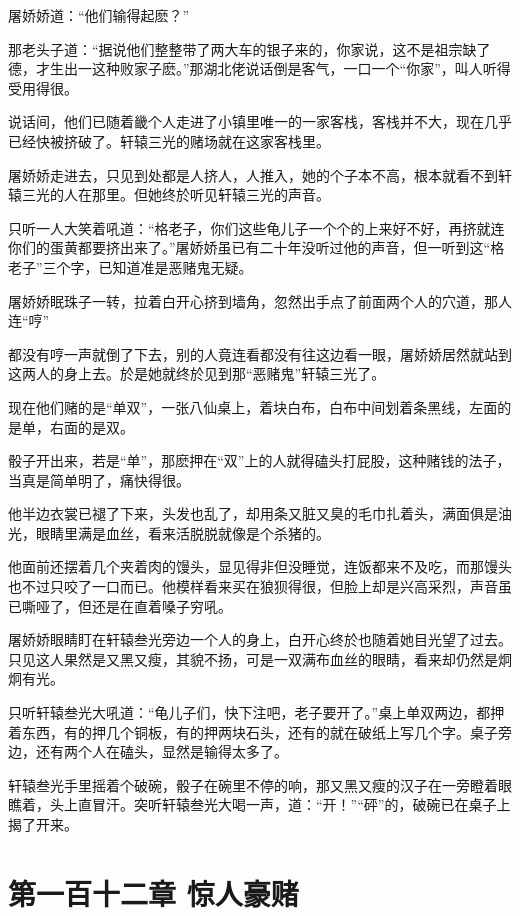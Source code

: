 \documentclass[12pt,oneside]{book}
\begin{document}
屠娇娇道：``他们输得起麽？''

那老头子道：``据说他们整整带了两大车的银子来的，你家说，这不是祖宗缺了德，才生出一这种败家子麽。''那湖北佬说话倒是客气，一口一个``你家''，叫人听得受用得很。

说话间，他们已随着畿个人走进了小镇里唯一的一家客栈，客栈并不大，现在几乎已经快被挤破了。轩辕三光的赌场就在这家客栈里。

屠娇娇走进去，只见到处都是人挤人，人推入，她的个子本不高，根本就看不到轩辕三光的人在那里。但她终於听见轩辕三光的声音。

只听一人大笑着吼道：``格老子，你们这些龟儿子一个个的上来好不好，再挤就连你们的蛋黄都要挤出来了。''屠娇娇虽已有二十年没听过他的声音，但一听到这``格老子''三个字，已知道准是恶赌鬼无疑。

屠娇娇眠珠子一转，拉着白开心挤到墙角，忽然出手点了前面两个人的穴道，那人连``哼''

都没有哼一声就倒了下去，别的人竟连看都没有往这边看一眼，屠娇娇居然就站到这两人的身上去。於是她就终於见到那``恶赌鬼''轩辕三光了。

现在他们赌的是``单双''，一张八仙桌上，着块白布，白布中间划着条黑线，左面的是单，右面的是双。

骰子开出来，若是``单''，那麽押在``双''上的人就得磕头打屁股，这种赌钱的法子，当真是简单明了，痛快得很。

他半边衣裳已褪了下来，头发也乱了，却用条又脏又臭的毛巾扎着头，满面俱是油光，眼睛里满是血丝，看来活脱脱就像是个杀猪的。

他面前还摆着几个夹着肉的馒头，显见得非但没睡觉，连饭都来不及吃，而那馒头也不过只咬了一口而已。他模样看来买在狼狈得很，但脸上却是兴高采烈，声音虽已嘶哑了，但还是在直着嗓子穷吼。

屠娇娇眼睛盯在轩辕叁光旁边一个人的身上，白开心终於也随着她目光望了过去。只见这人果然是又黑又瘦，其貌不扬，可是一双满布血丝的眼睛，看来却仍然是炯炯有光。

只听轩辕叁光大吼道：``龟儿子们，快下注吧，老子要开了。''桌上单双两边，都押着东西，有的押几个铜板，有的押两块石头，还有的就在破纸上写几个字。桌子旁边，还有两个人在磕头，显然是输得太多了。

轩辕叁光手里摇着个破碗，骰子在碗里不停的响，那又黑又瘦的汉子在一旁瞪着眼瞧着，头上直冒汗。突听轩辕叁光大喝一声，道：``开！''``砰''的，破碗已在桌子上揭了开来。

\hypertarget{ux7b2cux4e00ux767eux5341ux4e8cux7ae0-ux60caux4ebaux8c6aux8d4c}{%
\chapter{第一百十二章
惊人豪赌}\label{ux7b2cux4e00ux767eux5341ux4e8cux7ae0-ux60caux4ebaux8c6aux8d4c}}
\end{document}
